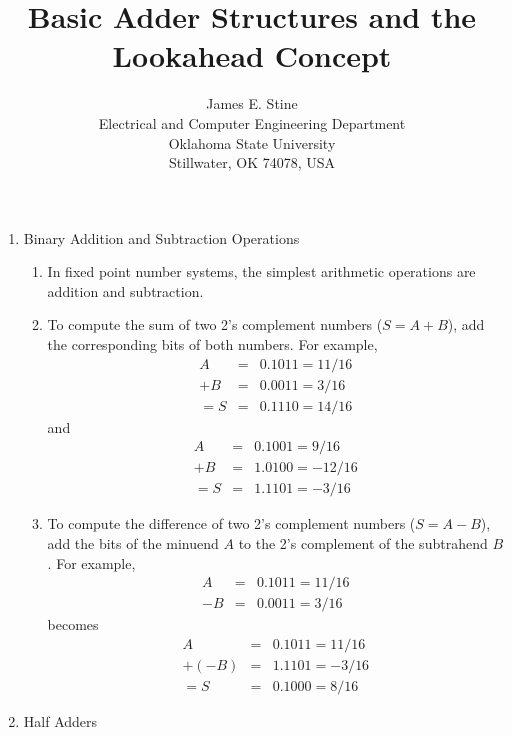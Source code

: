 \documentclass[times, twocolumn, 10pt]{article}
\begin{document}
\title{Basic Adder Structures and the Lookahead Concept}
\author{James E. Stine \\
  Electrical and Computer Engineering Department\\
  Oklahoma State University \\
  Stillwater, OK 74078, USA}
\date{}

\maketitle
\begin{enumerate}
\item Binary Addition and Subtraction Operations
  \begin{enumerate}
  \item In fixed point number systems, the simplest arithmetic operations 
    are addition and subtraction. 
  \item To compute the sum of two 2's complement numbers ($S = A + B$),
    add the corresponding bits of both numbers. For example, 
    \begin{eqnarray*}
      A  & = & 0.1011 = 11/16 \\
      + B  & = & 0.0011 =  3/16 \\
      = S  & = & 0.1110 = 14/16 
    \end{eqnarray*}
    and 
    \begin{eqnarray*}
      A  & = & 0.1001 =  9/16 \\
      + B  & = & 1.0100 =  -12/16 \\
      = S  & = & 1.1101 = -3/16 
    \end{eqnarray*}
  \item To compute the difference of two 2's complement numbers ($S = A - B$),
    add the bits of the minuend $A$ to the 2's complement of the subtrahend
    $B$. For example, 
    \begin{eqnarray*}
      A  & = & 0.1011 = 11/16 \\
      - B  & = & 0.0011 =  3/16 
    \end{eqnarray*}
    becomes 
    \begin{eqnarray*}
      A  & = & 0.1011 =  11/16 \\
      +(-B) & = & 1.1101 =  -3/16 \\
      = S  & = & 0.1000 = 8/16
    \end{eqnarray*}
  \end{enumerate}
\item Half Adders 

\end{enumerate}
\end{document}
